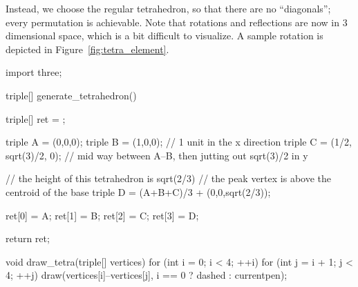 \documentclass[../key.tex]{subfiles}
\begin{document}
\noindent Instead, we choose the regular tetrahedron, so that there are no ``diagonals''; every permutation is achievable. Note that rotations and reflections are now in $3$ dimensional space, which is a bit difficult to visualize. A sample rotation is depicted in Figure~\ref{fig:tetra_element}.

\begin{asydef}
import three;

triple[] generate_tetrahedron() {
	triple[] ret = {};

	triple A = (0,0,0);
	triple B = (1,0,0); // 1 unit in the x direction
	triple C = (1/2, sqrt(3)/2, 0); // mid way between A--B, then jutting out sqrt(3)/2 in y

	// the height of this tetrahedron is sqrt(2/3)
	// the peak vertex is above the centroid of the base
	triple D = (A+B+C)/3 + (0,0,sqrt(2/3));

	ret[0] = A;
	ret[1] = B;
	ret[2] = C;
	ret[3] = D;

	return ret;
}

void draw_tetra(triple[] vertices) {
	for (int i = 0; i < 4; ++i) {
		for (int j = i + 1; j < 4; ++j) {
			draw(vertices[i]--vertices[j], i == 0 ? dashed : currentpen);
		}
	}
}

\end{asydef}
\end{document}
